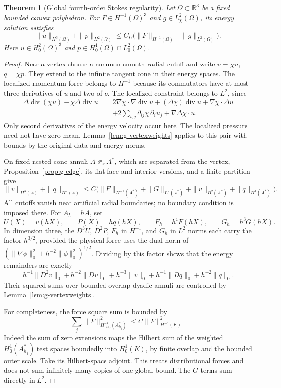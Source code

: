 \documentclass[11pt,a4paper]{article}
\newtheorem{theorem}{Theorem}[section]
\theoremstyle{remark}
\numberwithin{equation}{section}
\begin{document}
\begin{theorem}[Global fourth-order Stokes regularity]\label{thm:g-stokes}
Let $\Omega\subset\mathbb R^3$ be a fixed bounded convex polyhedron. For
$F\in H^{-1}(\Omega)^3$ and $g\in L^2_\chi(\Omega)$, its energy solution
satisfies
\[
 \|u\|_{H^3(\Omega)}+\|p\|_{H^2(\Omega)}
 \le C_\Omega\bigl(\|F\|_{H^{-1}(\Omega)}+\|g\|_{L^2(\Omega)}\bigr).
\]
Here $u\in H^2_0(\Omega)^3$ and $p\in H^1_0(\Omega)\cap L^2_0(\Omega)$.
\end{theorem}
\begin{proof}
Near a vertex choose a common smooth radial cutoff and write
$v=\chi u$, $q=\chi p$. They extend to the infinite tangent cone in their
energy spaces. The localized momentum force belongs to $H^{-1}$ because its
commutators have at most three derivatives of $u$ and two of $p$. The localized
constraint belongs to $L^2$, since
\[
 \begin{split}
 \Delta\operatorname{div}(\chi u)-\chi\Delta\operatorname{div}u
 ={}&2\nabla\chi\cdot\nabla\operatorname{div}u
 +(\Delta\chi)\operatorname{div}u+\nabla\chi\cdot\Delta u\\
 &+2\sum_{i,j}\partial_{ij}\chi\,\partial_i u_j
 +\nabla\Delta\chi\cdot u.
 \end{split}
\]
Only second derivatives of the energy velocity occur here. The localized
pressure need not have zero mean. Lemma~\ref{lem:g-vertexweights} applies to
this pair with bounds by the original data and energy norms.

On fixed nested cone annuli $A\Subset_r A^*$, which are separated from the
vertex, Proposition~\ref{prop:g-edge}, its flat-face and interior versions,
and a finite partition give
\[
 \|v\|_{H^3(A)}+\|q\|_{H^2(A)}
 \le C\bigl(\|F\|_{H^{-1}(A^*)}+\|G\|_{L^2(A^*)}
                  +\|v\|_{H^2(A^*)}+\|q\|_{H^1(A^*)}\bigr).
\]
All cutoffs vanish near artificial radial boundaries; no boundary condition
is imposed there. For $A_h=hA$, set
\[
 U(X)=v(hX),\qquad P(X)=h q(hX),\qquad
 F_h=h^4F(hX),\qquad G_h=h^3G(hX).
\]
In dimension three, the $D^3U$, $D^2P$, $F_h$ in $H^{-1}$, and $G_h$ in
$L^2$ norms each carry the factor $h^{3/2}$, provided the physical force uses
the dual norm of
$(\|\nabla\phi\|_0^2+h^{-2}\|\phi\|_0^2)^{1/2}$. Dividing by this factor
shows that the energy remainders are exactly
\[
 h^{-1}\|D^2v\|_0+h^{-2}\|Dv\|_0+h^{-3}\|v\|_0
 +h^{-1}\|Dq\|_0+h^{-2}\|q\|_0.
\]
Their squared sums over bounded-overlap dyadic annuli are controlled by
Lemma~\ref{lem:g-vertexweights}.

For completeness, the force square sum is bounded by
\begin{equation}\label{eq:g-force-dyadic-dual}
 \sum_j\|F\|_{H^{-1}_{1/h_j}(A_{h_j}^*)}^2
 \le C\|F\|_{H^{-1}(K)}^2.
\end{equation}
Indeed the sum of zero extensions maps the Hilbert sum of the weighted
$H^1_0(A_{h_j}^*)$ test spaces boundedly into $H^1_0(K)$, by finite overlap
and the bounded outer scale. Take its Hilbert-space adjoint. This treats
distributional forces and does not sum infinitely many copies of one global
bound. The $G$ terms sum directly in $L^2$.


\end{proof}
\end{document}
